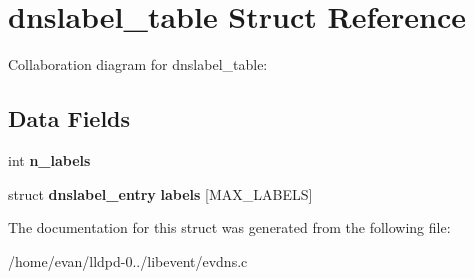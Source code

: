 \section{dnslabel\-\_\-table \-Struct \-Reference}
\label{structdnslabel__table}


\-Collaboration diagram for dnslabel\-\_\-table\-:
\subsection*{\-Data \-Fields}
\begin{DoxyCompactItemize}
\item 
int {\bfseries n\-\_\-labels}\label{structdnslabel__table_a5660520289395ef83f18546b5c9ffe1d}

\item 
struct {\bf dnslabel\-\_\-entry} {\bfseries labels} [\-M\-A\-X\-\_\-\-L\-A\-B\-E\-L\-S]\label{structdnslabel__table_a955cd8aae9c081a60e8cff5a29a4a6d4}

\end{DoxyCompactItemize}


\-The documentation for this struct was generated from the following file\-:\begin{DoxyCompactItemize}
\item 
/home/evan/lldpd-\/0../libevent/evdns.\-c\end{DoxyCompactItemize}
